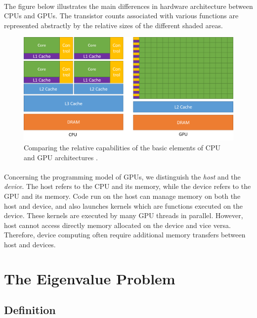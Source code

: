 \paragraph*{}
The figure below illustrates the main differences in hardware architecture between CPUs and GPUs. The transistor counts associated with various functions are represented abstractly by the relative sizes of the different shaded areas.

\begin{figure}[h]
\includegraphics[width=\textwidth]{assets/figures/gpu-devotes-more-transistors-to-data-processing.png}
\centering
\caption{Comparing the relative capabilities of the basic elements of CPU and GPU architectures \cite{cuda}.}
\end{figure}

\paragraph*{}
Concerning the programming model of GPUs, we distinguish the \textit{host} and the \textit{device}. The host refers to the CPU and its memory, while the device refers to the GPU and its memory. Code run on the host can manage memory on both the host and device, and also launches kernels which are functions executed on the device. These kernels are executed by many GPU threads in parallel. However, host cannot access directly memory allocated on the device and vice versa. Therefore, device computing often require additional memory transfers between host and devices.

\newpage
\section{The Eigenvalue Problem}
\subsection{Definition}

